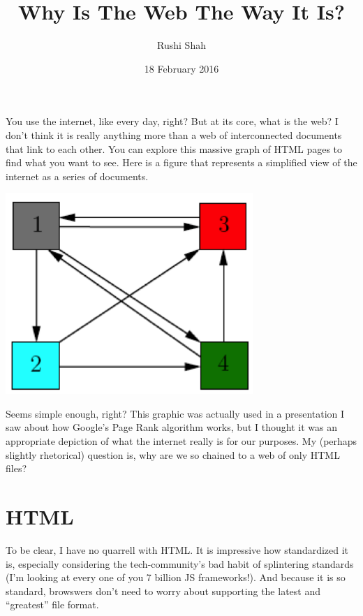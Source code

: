 \documentclass[12pt]{article}
\title{Why Is The Web The Way It Is?}
\author{Rushi Shah}
\date{18 February 2016}
\begin{document}
  \maketitle


  You use the internet, like every day, right? But at its core, what is the web? I don't think it is really anything more than a web of interconnected documents that link to each other. You can explore this massive graph of HTML pages to find what you want to see. Here is a figure that represents a simplified view of the internet as a series of documents. 

  \begin{center}
  \includegraphics[height=3in]{documents}
  \end{center}

  Seems simple enough, right? This graphic was actually used in a presentation I saw about how Google's Page Rank algorithm works, but I thought it was an appropriate depiction of what the internet really is for our purposes. My (perhaps slightly rhetorical) question is, why are we so chained to a web of only HTML files?

  \section{HTML}

  To be clear, I have no quarrell with HTML. It is impressive how standardized it is, especially considering the tech-community's bad habit of splintering standards (I'm looking at every one of you 7 billion JS frameworks!). And because it is so standard, browswers don't need to worry about supporting the latest and ``greatest'' file format.
\end{document}
